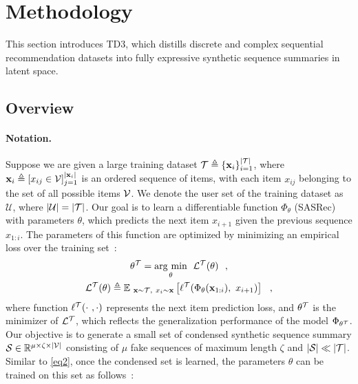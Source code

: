 \section{Methodology}
\vspace{1.5mm}

This section introduces TD3, which distills discrete and complex sequential recommendation datasets into fully expressive synthetic sequence summaries in latent space. 


\subsection{Overview}

\paragraph{Notation.}
Suppose we are given a large training dataset $\mathcal{T} \triangleq \{ \mathbf{x}_i \}_{i=1}^{ |\mathcal{T}| }$, where $\mathbf{x}_i \triangleq [x_{ij} \in \mathcal{V}]_{j=1}^{ |\mathbf{x}_i| }$ is an ordered sequence of items, with each item $x_{ij}$ belonging to the set of all possible items $\mathcal{V}$. We denote the user set of the training dataset as $\mathcal{U}$, where $|\mathcal{U}| = |\mathcal{T}|$. Our goal is to learn a differentiable function $\Phi_\theta$ (\ie SASRec) with parameters $\theta$, which predicts the next item $x_{i+1}$ given the previous sequence $x_{1:i}$. The parameters of this function are optimized by minimizing an empirical loss over the training set~:
\begin{equation} \label{eq2}
\begin{gathered}
    \theta^{\mathcal{T}} = \underset{\theta}{\operatorname{arg}\,\operatorname{min}}\;\  \mathcal{L}^{\mathcal{T}}(\theta) ~~, \\
    \mathcal{L}^{\mathcal{T}}(\theta) \triangleq \mathbb{E}_{~\mathbf{x} \sim \mathcal{T},~ x_i \sim \mathbf{x}} \left[\ell^{\mathcal{T}}(\Phi_{\theta}(\mathbf{x}_{1:i}),~ x_{i+1})\right] ~~,
\end{gathered}
\end{equation}
where function $\ell^{\mathcal{T}}(\cdot~,\cdot)$ represents the next item prediction loss, and $\theta^{\mathcal{T}}$ is the minimizer of $\mathcal{L}^{\mathcal{T}}$, which reflects the generalization performance of the model $\Phi_{\theta^{\mathcal{T}}}$. 
Our objective is to generate a small set of condensed synthetic sequence summary $\mathcal{S} \in \mathbb{R}^{\mu \times \zeta \times |\mathcal{V}|}$ consisting of $\mu$ fake sequences of maximum length $\zeta$ and $|\mathcal{S}| \ll |\mathcal{T}|$. Similar to \cref{eq2}, once the condensed set is learned, the parameters $\theta$ can be trained on this set as follows~:
